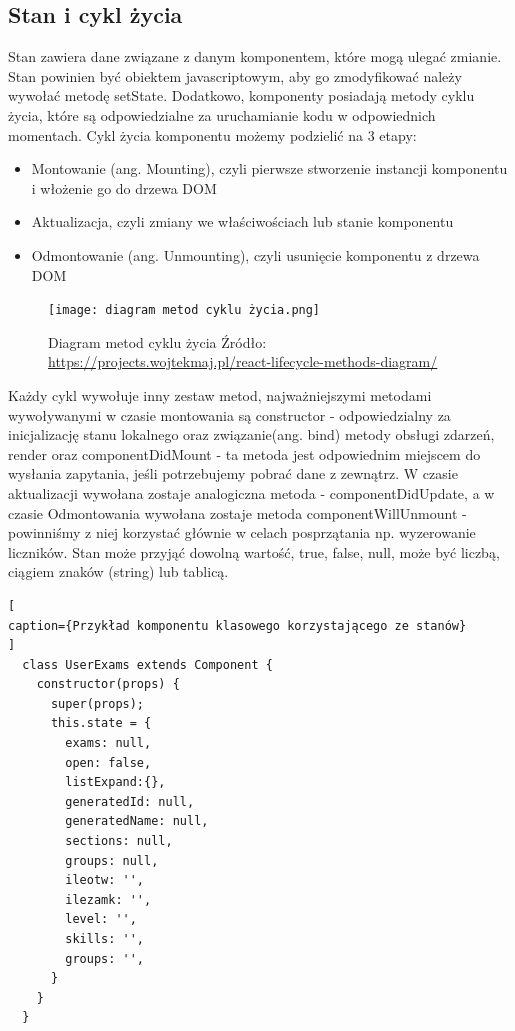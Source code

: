 \documentclass[oneside,polski,logo,indent]{amuthesis}
\begin{document}
\subsection{Stan i cykl życia}{

Stan zawiera dane związane z danym komponentem, które mogą ulegać zmianie. Stan powinien być obiektem javascriptowym, aby go zmodyfikować należy wywołać metodę setState. Dodatkowo, komponenty posiadają metody cyklu życia, które są odpowiedzialne za uruchamianie kodu w odpowiednich momentach.
\newline
Cykl życia komponentu możemy podzielić na 3 etapy:

\begin{itemize}
\item Montowanie (ang. Mounting), czyli pierwsze stworzenie instancji komponentu i włożenie go do drzewa DOM
\item Aktualizacja, czyli zmiany we właściwościach lub stanie komponentu
\item Odmontowanie (ang. Unmounting), czyli usunięcie komponentu z drzewa DOM
\end{itemize}
\begin{figure}[H]
\centering
\texttt{[image: diagram metod cyklu życia.png]}
\caption{Diagram metod cyklu życia
\newline
Źródło: \url{https://projects.wojtekmaj.pl/react-lifecycle-methods-diagram/}
}
\label{metody cyklu zycia}
\end{figure}
Każdy cykl wywołuje inny zestaw metod, najważniejszymi metodami wywoływanymi w czasie montowania są constructor - odpowiedzialny za inicjalizację stanu lokalnego oraz związanie(ang. bind) metody obsługi zdarzeń, render oraz componentDidMount - ta metoda jest odpowiednim miejscem do wysłania zapytania, jeśli potrzebujemy pobrać dane z zewnątrz.
W czasie aktualizacji wywołana zostaje analogiczna metoda - componentDidUpdate, a w czasie Odmontowania wywołana zostaje metoda componentWillUnmount - powinniśmy z niej korzystać głównie w celach posprzątania np. wyzerowanie liczników.
\newline
\newline
Stan może przyjąć dowolną wartość, true, false, null, może być liczbą, ciągiem znaków (string) lub tablicą.

\begin{lstlisting}[
caption={Przykład komponentu klasowego korzystającego ze stanów}
]
  class UserExams extends Component {
    constructor(props) {
      super(props);
      this.state = {
        exams: null,
        open: false,
        listExpand:{},
        generatedId: null,
        generatedName: null,
        sections: null,
        groups: null,
        ileotw: '',
        ilezamk: '',
        level: '',
        skills: '', 
        groups: '',
      }
    }
  }

\end{lstlisting}

}
\end{document}
